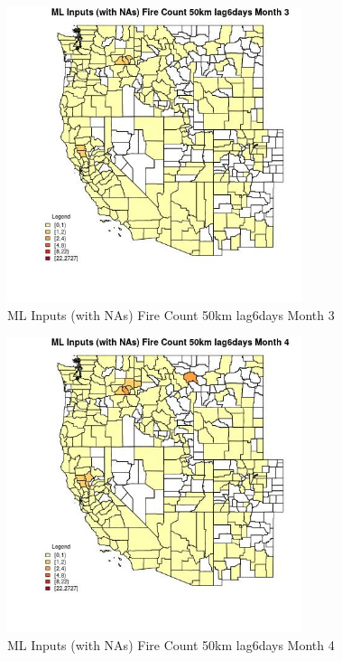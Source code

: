 \begin{figure} 
\centering  
\includegraphics[width=0.77\textwidth]{Code_Outputs/Report_ML_input_PM25_Step4_part_f_de_duplicated_aves_prioritize_24hr_obswNAs_CountyFire_Count_50km_lag6daysmedianMonth3.jpg} 
\caption{\label{fig:Report_ML_input_PM25_Step4_part_f_de_duplicated_aves_prioritize_24hr_obswNAsCountyFire_Count_50km_lag6daysmedianMonth3}ML Inputs (with NAs) Fire Count 50km lag6days Month 3} 
\end{figure} 
 

\begin{figure} 
\centering  
\includegraphics[width=0.77\textwidth]{Code_Outputs/Report_ML_input_PM25_Step4_part_f_de_duplicated_aves_prioritize_24hr_obswNAs_CountyFire_Count_50km_lag6daysmedianMonth4.jpg} 
\caption{\label{fig:Report_ML_input_PM25_Step4_part_f_de_duplicated_aves_prioritize_24hr_obswNAsCountyFire_Count_50km_lag6daysmedianMonth4}ML Inputs (with NAs) Fire Count 50km lag6days Month 4} 
\end{figure} 
 

